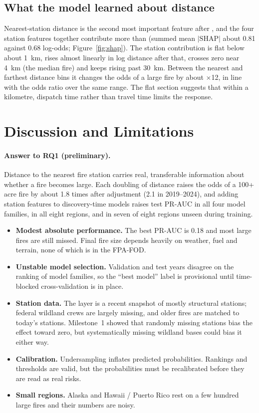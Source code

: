 \documentclass[10pt,twocolumn,letterpaper]{article}
\newcommand{\code}[1]{\texttt{\detokenize{#1}}}
\begin{document}
\subsection{What the model learned about distance}
Nearest-station distance is the second most important feature after \code{STATE}, and the four station features together contribute more than \code{STATE} (summed mean $|\text{SHAP}|$ about 0.81 against 0.68 log-odds; Figure~\ref{fig:shap}). The station contribution is flat below about 1~km, rises almost linearly in log distance after that, crosses zero near 4~km (the median fire) and keeps rising past 30~km. Between the nearest and farthest distance bins it changes the odds of a large fire by about $\times$12, in line with the odds ratio over the same range. The flat section suggests that within a kilometre, dispatch time rather than travel time limits the response.

\section{Discussion and Limitations}
\paragraph{Answer to RQ1 (preliminary).} Distance to the nearest fire station carries real, transferable information about whether a fire becomes large. Each doubling of distance raises the odds of a 100+ acre fire by about 1.8 times after adjustment (2.1 in 2019--2024), and adding station features to discovery-time models raises test PR-AUC in all four model families, in all eight regions, and in seven of eight regions unseen during training.

\begin{itemize}
\item \textbf{Modest absolute performance.} The best PR-AUC is 0.18 and most large fires are still missed. Final fire size depends heavily on weather, fuel and terrain, none of which is in the FPA-FOD.
\item \textbf{Unstable model selection.} Validation and test years disagree on the ranking of model families, so the ``best model'' label is provisional until time-blocked cross-validation is in place.
\item \textbf{Station data.} The layer is a recent snapshot of mostly structural stations; federal wildland crews are largely missing, and older fires are matched to today's stations. Milestone~1 showed that randomly missing stations bias the effect toward zero, but systematically missing wildland bases could bias it either way.
\item \textbf{Calibration.} Undersampling inflates predicted probabilities. Rankings and thresholds are valid, but the probabilities must be recalibrated before they are read as real risks.
\item \textbf{Small regions.} Alaska and Hawaii / Puerto Rico rest on a few hundred large fires and their numbers are noisy.
\end{itemize}
\end{document}
